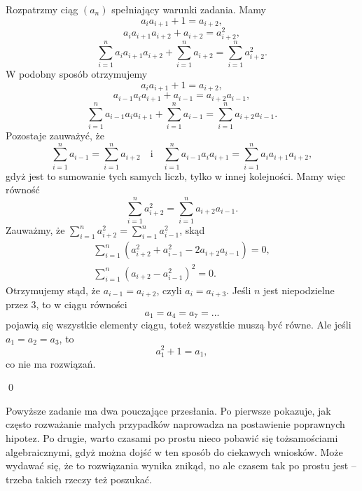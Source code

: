 \vspace{10px}
\noindent
Rozpatrzmy ciąg $(a_n)$ spełniający warunki zadania. Mamy
\[
	a_ia_{i + 1} + 1 = a_{i + 2},
\]
\[
	a_ia_{i + 1}a_{i + 2} + a_{i + 2} = a_{i + 2}^2,
\]
\[
	\sum_{i = 1}^{n} a_ia_{i + 1}a_{i + 2} + \sum_{i = 1}^{n} a_{i + 2} = \sum_{i = 1}^{n} a_{i + 2}^2.
\]
W podobny sposób otrzymujemy
\[
	a_ia_{i + 1} + 1 = a_{i + 2},
\]
\[
	a_{i - 1}a_ia_{i + 1} + a_{i - 1} = a_{i + 2}a_{i - 1},
\]
\[
	\sum_{i = 1}^{n} a_{i - 1}a_ia_{i + 1} + \sum_{i = 1}^{n} a_{i - 1} = \sum_{i = 1}^{n} a_{i + 2}a_{i - 1}.
\]
Pozostaje zauważyć, że
\[
	\sum_{i = 1}^{n} a_{i - 1} = \sum_{i = 1}^{n} a_{i + 2} \quad \text{i} \quad \sum_{i = 1}^{n} a_{i - 1}a_ia_{i + 1} = \sum_{i = 1}^{n} a_ia_{i + 1}a_{i + 2},
\]
gdyż jest to sumowanie tych samych liczb, tylko w innej kolejności. Mamy więc równość
\[
	\sum_{i = 1}^{n} a_{i + 2}^2 = \sum_{i = 1}^{n} a_{i + 2}a_{i - 1}.
\]
Zauważmy, że $\sum_{i = 1}^{n} a_{i + 2}^2 = \sum_{i = 1}^{n} a_{i - 1}^2$, skąd
\begin{align*}
	\sum_{i = 1}^{n} \left(a_{i + 2}^2 + a_{i - 1}^2 - 2a_{i + 2}a_{i - 1}\right) = 0, \\
	\sum_{i = 1}^{n} \left(a_{i + 2} - a_{i - 1}^2\right)^2 = 0.
\end{align*}
Otrzymujemy stąd, że $a_{i - 1} = a_{i + 2}$, czyli $a_i = a_{i + 3}$. Jeśli $n$ jest niepodzielne przez $3$, to w ciągu równości
\[
	a_1 = a_4 = a_7 = ...
\]
pojawią się wszystkie elementy ciągu, toteż wszystkie muszą być równe. Ale jeśli ${a_1 = a_2 = a_3}$, to
\[
	a_1^2 + 1 = a_1,
\]
co nie ma rozwiązań.

\qed

\noindent
Powyższe zadanie ma dwa pouczające przesłania. Po pierwsze pokazuje, jak często rozważanie małych przypadków naprowadza na postawienie poprawnych hipotez. Po drugie, warto czasami po prostu nieco pobawić się tożsamościami algebraicznymi, gdyż można dojść w ten sposób do ciekawych wniosków. Może wydawać się, że to rozwiązania wynika znikąd, no ale czasem tak po prostu jest -- trzeba takich rzeczy też poszukać.

\vspace{10px}